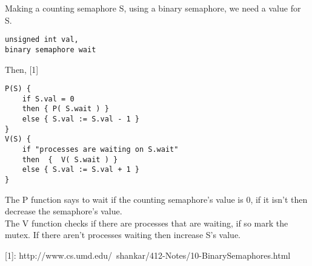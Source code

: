 \documentclass[12pt]{article}
\begin{document}
	Making a counting semaphore S, using a binary semaphore, we need a value for S. 
	\begin{Verbatim}
unsigned int val,
binary semaphore wait
	\end{Verbatim}
	
	Then, [1]
	\begin{Verbatim}
P(S) {  
	if S.val = 0  
	then { P( S.wait ) }  
	else { S.val := S.val - 1 }  
}
V(S) {  
	if "processes are waiting on S.wait"  
	then  {  V( S.wait ) }  
	else { S.val := S.val + 1 }  
}
	\end{Verbatim}
	
	
	The P function says to wait if the counting semaphore's value is 0, if it isn't then decrease the semaphore's value.\\
	The V function checks if there are processes that are waiting, if so mark the mutex. If there aren't processes waiting then increase S's value.
	
		
	[1]: http://www.cs.umd.edu/~shankar/412-Notes/10-BinarySemaphores.html
	
\end{document}
